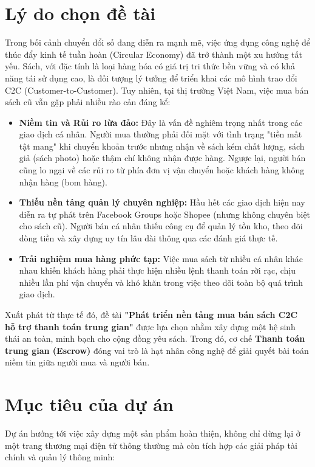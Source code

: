 \documentclass[../main.tex]{subfiles}
\begin{document}
\section{Lý do chọn đề tài}
Trong bối cảnh chuyển đổi số đang diễn ra mạnh mẽ, việc ứng dụng công nghệ để thúc đẩy kinh tế tuần hoàn (Circular Economy) đã trở thành một xu hướng tất yếu. Sách, với đặc tính là loại hàng hóa có giá trị tri thức bền vững và có khả năng tái sử dụng cao, là đối tượng lý tưởng để triển khai các mô hình trao đổi C2C (Customer-to-Customer). Tuy nhiên, tại thị trường Việt Nam, việc mua bán sách cũ vẫn gặp phải nhiều rào cản đáng kể:

\begin{itemize}
    \item \textbf{Niềm tin và Rủi ro lừa đảo:} Đây là vấn đề nghiêm trọng nhất trong các giao dịch cá nhân. Người mua thường phải đối mặt với tình trạng "tiền mất tật mang" khi chuyển khoản trước nhưng nhận về sách kém chất lượng, sách giả (sách photo) hoặc thậm chí không nhận được hàng. Ngược lại, người bán cũng lo ngại về các rủi ro từ phía đơn vị vận chuyển hoặc khách hàng không nhận hàng (bom hàng).
    \item \textbf{Thiếu nền tảng quản lý chuyên nghiệp:} Hầu hết các giao dịch hiện nay diễn ra tự phát trên Facebook Groups hoặc Shopee (nhưng không chuyên biệt cho sách cũ). Người bán cá nhân thiếu công cụ để quản lý tồn kho, theo dõi dòng tiền và xây dựng uy tín lâu dài thông qua các đánh giá thực tế.
    \item \textbf{Trải nghiệm mua hàng phức tạp:} Việc mua sách từ nhiều cá nhân khác nhau khiến khách hàng phải thực hiện nhiều lệnh thanh toán rời rạc, chịu nhiều lần phí vận chuyển và khó khăn trong việc theo dõi toàn bộ quá trình giao dịch.
\end{itemize}

Xuất phát từ thực tế đó, đề tài \textbf{"Phát triển nền tảng mua bán sách C2C hỗ trợ thanh toán trung gian"} được lựa chọn nhằm xây dựng một hệ sinh thái an toàn, minh bạch cho cộng đồng yêu sách. Trong đó, cơ chế \textbf{Thanh toán trung gian (Escrow)} đóng vai trò là hạt nhân công nghệ để giải quyết bài toán niềm tin giữa người mua và người bán.

\section{Mục tiêu của dự án}
Dự án hướng tới việc xây dựng một sản phẩm hoàn thiện, không chỉ dừng lại ở một trang thương mại điện tử thông thường mà còn tích hợp các giải pháp tài chính và quản lý thông minh:
\end{document}
